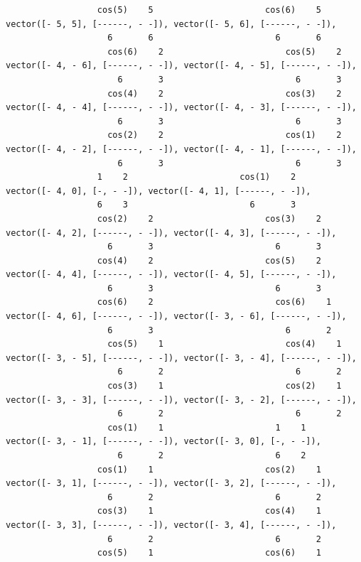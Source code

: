\documentclass[12pt,letterpaper]{article}
\begin{document}
\begin{verbatim}
                  cos(5)    5                      cos(6)    5
vector([- 5, 5], [------, - -]), vector([- 5, 6], [------, - -]), 
                    6       6                        6       6
                    cos(6)    2                        cos(5)    2
vector([- 4, - 6], [------, - -]), vector([- 4, - 5], [------, - -]), 
                      6       3                          6       3
                    cos(4)    2                        cos(3)    2
vector([- 4, - 4], [------, - -]), vector([- 4, - 3], [------, - -]), 
                      6       3                          6       3
                    cos(2)    2                        cos(1)    2
vector([- 4, - 2], [------, - -]), vector([- 4, - 1], [------, - -]), 
                      6       3                          6       3
                  1    2                      cos(1)    2
vector([- 4, 0], [-, - -]), vector([- 4, 1], [------, - -]), 
                  6    3                        6       3
                  cos(2)    2                      cos(3)    2
vector([- 4, 2], [------, - -]), vector([- 4, 3], [------, - -]), 
                    6       3                        6       3
                  cos(4)    2                      cos(5)    2
vector([- 4, 4], [------, - -]), vector([- 4, 5], [------, - -]), 
                    6       3                        6       3
                  cos(6)    2                        cos(6)    1
vector([- 4, 6], [------, - -]), vector([- 3, - 6], [------, - -]), 
                    6       3                          6       2
                    cos(5)    1                        cos(4)    1
vector([- 3, - 5], [------, - -]), vector([- 3, - 4], [------, - -]), 
                      6       2                          6       2
                    cos(3)    1                        cos(2)    1
vector([- 3, - 3], [------, - -]), vector([- 3, - 2], [------, - -]), 
                      6       2                          6       2
                    cos(1)    1                      1    1
vector([- 3, - 1], [------, - -]), vector([- 3, 0], [-, - -]), 
                      6       2                      6    2
                  cos(1)    1                      cos(2)    1
vector([- 3, 1], [------, - -]), vector([- 3, 2], [------, - -]), 
                    6       2                        6       2
                  cos(3)    1                      cos(4)    1
vector([- 3, 3], [------, - -]), vector([- 3, 4], [------, - -]), 
                    6       2                        6       2
                  cos(5)    1                      cos(6)    1

\end{verbatim}
\end{document}

